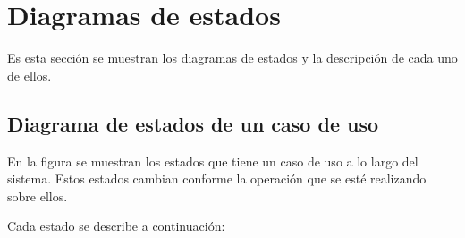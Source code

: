 \section{Diagramas de estados}
Es esta sección se muestran los diagramas de estados y la descripción de cada uno de ellos.\\

\subsection{Diagrama de estados de un caso de uso}

En la figura  se muestran los estados que tiene un caso de uso a lo largo 
del sistema. Estos estados cambian conforme la operación que se esté realizando sobre ellos.\\


\clearpage
Cada estado se describe a continuación:

